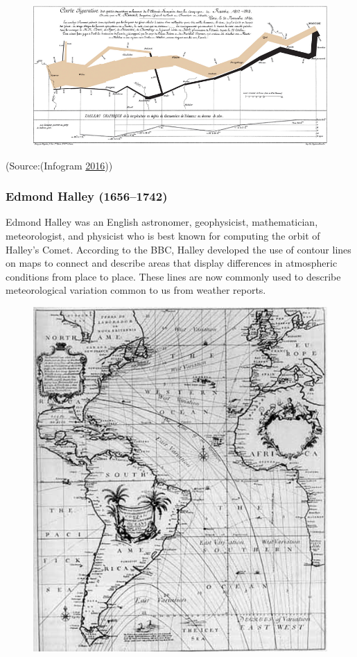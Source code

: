 \documentclass[]{book}
\theoremstyle{definition}
\theoremstyle{definition}
\theoremstyle{definition}
\theoremstyle{remark}
\begin{document}
\begin{figure}
\centering
\includegraphics{images/Minard.png}
\caption{}
\end{figure}

(Source:(Infogram \protect\hyperlink{ref-history_viz}{2016}))

\subsubsection{Edmond Halley (1656--1742)}\label{edmond-halley-16561742}

Edmond Halley was an English astronomer, geophysicist, mathematician,
meteorologist, and physicist who is best known for computing the orbit
of Halley's Comet. According to the BBC, Halley developed the use of
contour lines on maps to connect and describe areas that display
differences in atmospheric conditions from place to place. These lines
are now commonly used to describe meteorological variation common to us
from weather reports.

\begin{figure}
\centering
\includegraphics{images/Edmond.png}
\caption{}
\end{figure}
\end{document}
